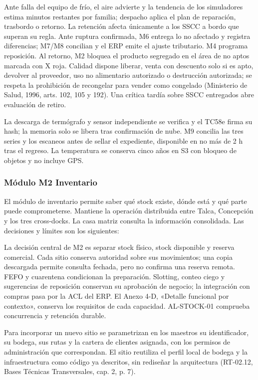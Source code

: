 Ante falla del equipo de frío, el aire advierte y la tendencia de los simuladores estima minutos restantes por familia; despacho aplica el plan de reparación, trasbordo o retorno. La retención afecta únicamente a los SSCC a bordo que superan su regla. Ante ruptura confirmada, M6 entrega lo no afectado y registra diferencias; M7/M8 concilian y el ERP emite el ajuste tributario. M4 programa reposición. Al retorno, M2 bloquea el producto segregado en el área de no aptos marcada con X roja. Calidad dispone liberar, venta con descuento solo si es apto, devolver al proveedor, uso no alimentario autorizado o destrucción autorizada; se respeta la prohibición de recongelar para vender como congelado (Ministerio de Salud, 1996, arts. 102, 105 y 192). Una crítica tardía sobre SSCC entregados abre evaluación de retiro.

La descarga de termógrafo y sensor independiente se verifica y el TC58e firma su hash; la memoria solo se libera tras confirmación de nube. M9 concilia las tres series y los escaneos antes de sellar el expediente, disponible en no más de 2 h tras el regreso. La temperatura se conserva cinco años en S3 con bloqueo de objetos y no incluye GPS.

\subsubsection{Módulo M2 Inventario}
\label{subsec:modulo-m2}

El módulo de inventario permite saber qué stock existe, dónde está y qué parte puede comprometerse. Mantiene la operación distribuida entre Talca, Concepción y los tres cross-docks. La casa matriz consulta la información consolidada. Las decisiones y límites son los siguientes:

La decisión central de M2 es separar stock físico, stock disponible y reserva comercial. Cada sitio conserva autoridad sobre sus movimientos; una copia descargada permite consulta fechada, pero no confirma una reserva remota. FEFO y cuarentena condicionan la preparación. Slotting, conteo ciego y sugerencias de reposición conservan su aprobación de negocio; la integración con compras pasa por la ACL del ERP. El Anexo 4-D, «Detalle funcional por contexto», conserva los requisitos de cada capacidad. AL-STOCK-01 comprueba concurrencia y retención durable.

Para incorporar un nuevo sitio se parametrizan en los maestros su identificador, su bodega, sus rutas y la cartera de clientes asignada, con los permisos de administración que correspondan. El sitio reutiliza el perfil local de bodega y la infraestructura como código ya descritos, sin rediseñar la arquitectura (RT-02.12, Bases Técnicas Transversales, cap. 2, p. 7).

